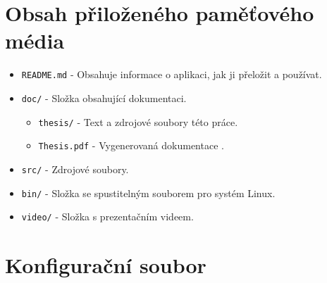 





\chapter{Obsah přiloženého paměťového média}

\begin{itemize}  
\item \texttt{README.md} - Obsahuje informace o aplikaci, jak ji přeložit a používat.
\item \texttt{doc/} - Složka obsahující dokumentaci.
\begin{itemize}
\item \texttt{thesis/} - Text a zdrojové soubory této práce.
\item \texttt{Thesis.pdf} - Vygenerovaná dokumentace .
\end{itemize}
\item \texttt{src/} - Zdrojové soubory.
\item \texttt{bin/} - Složka se spustitelným souborem pro systém Linux.
\item \texttt{video/} - Složka s prezentačním videem.
\end{itemize}

\chapter{Konfigurační soubor}
\label{appendix:configfile}

